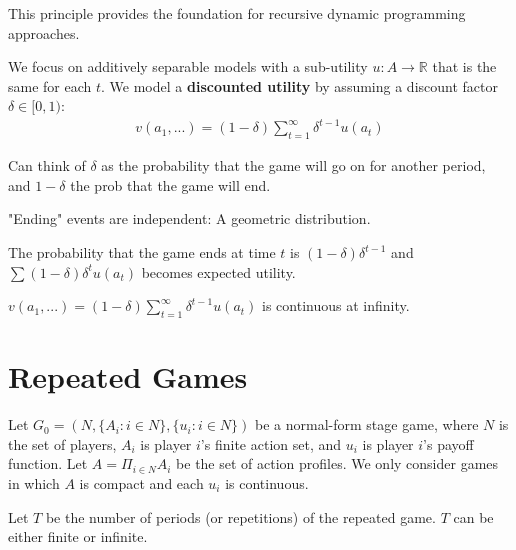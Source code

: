 \documentclass[11pt]{elegantbook_2}
\begin{document}
This principle provides the foundation for recursive dynamic programming approaches.

\begin{definition}
We focus on additively separable models with a sub-utility $u:A \rightarrow \mathbb{R}$ that is the same for each $t$. We model a \textbf{discounted utility} by assuming a discount factor $\delta\in[0,1)$:
\begin{equation}
    \begin{aligned}
        v(a_1,...)=(1-\delta)\sum_{t=1}^\infty \delta^{t-1}u(a_t)
    \end{aligned}
    \nonumber
\end{equation}
\end{definition}

Can think of $\delta$ as the probability that the game will go on for another period, and $1-\delta$ the prob that the game will end.

"Ending" events are independent: A geometric distribution.

The probability that the game ends at time $t$ is $(1 - \delta)\delta^{t-1}$ and $\sum(1-\delta)\delta^t u(a_t)$ becomes expected utility.

\begin{proposition}
    $v(a_1,...)=(1-\delta)\sum_{t=1}^\infty \delta^{t-1}u(a_t)$ is continuous at infinity.
\end{proposition}

\section{Repeated Games}
Let $G_0=\left(N,\{A_i:i\in N\},\{u_i:i\in N\}\right)$ be a normal-form stage game, where $N$ is the set of players, $A_i$ is player $i$'s finite action set, and $u_i$ is player $i$'s payoff function. Let $A=\Pi_{i\in N}A_i$ be the set of action profiles. We only consider games in which $A$ is compact and each $u_i$ is continuous.

Let $T$ be the number of periods (or repetitions) of the repeated game. $T$ can be either finite or infinite.
\end{document}
